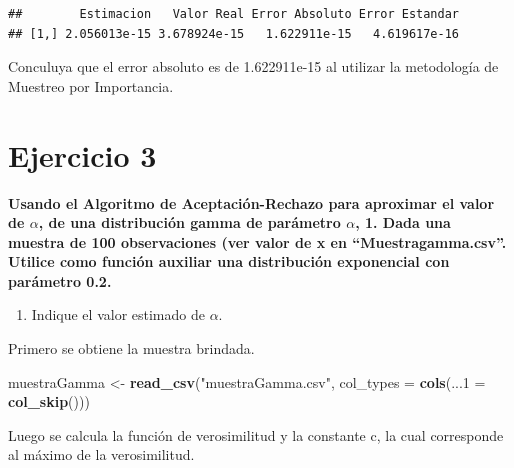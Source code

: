 \documentclass[
]{article}
\newenvironment{Shaded}{\begin{snugshade}}{\end{snugshade}}
\newcommand{\AttributeTok}[1]{\textcolor[rgb]{0.13,0.29,0.53}{#1}}
\newcommand{\ConstantTok}[1]{\textcolor[rgb]{0.56,0.35,0.01}{#1}}
\newcommand{\ControlFlowTok}[1]{\textcolor[rgb]{0.13,0.29,0.53}{\textbf{#1}}}
\newcommand{\FunctionTok}[1]{\textcolor[rgb]{0.13,0.29,0.53}{\textbf{#1}}}
\newcommand{\NormalTok}[1]{#1}
\newcommand{\OtherTok}[1]{\textcolor[rgb]{0.56,0.35,0.01}{#1}}
\newcommand{\SpecialCharTok}[1]{\textcolor[rgb]{0.81,0.36,0.00}{\textbf{#1}}}
\newcommand{\StringTok}[1]{\textcolor[rgb]{0.31,0.60,0.02}{#1}}
\providecommand{\tightlist}{%
  \setlength{\itemsep}{0pt}\setlength{\parskip}{0pt}}
\begin{document}
\begin{verbatim}
##        Estimacion   Valor Real Error Absoluto Error Estandar
## [1,] 2.056013e-15 3.678924e-15   1.622911e-15   4.619617e-16
\end{verbatim}

Conculuya que el error absoluto es de 1.622911e-15 al utilizar la
metodología de Muestreo por Importancia.

\newpage

\hypertarget{ejercicio-3}{%
\section{Ejercicio 3}\label{ejercicio-3}}

\textbf{Usando el Algoritmo de Aceptación-Rechazo para aproximar el
valor de \(\alpha\), de una distribución gamma de parámetro \(\alpha\),
1. Dada una muestra de 100 observaciones (ver valor de x en
``Muestragamma.csv''. Utilice como función auxiliar una distribución
exponencial con parámetro 0.2.}

\begin{enumerate}
\def\labelenumi{\alph{enumi}.}
\tightlist
\item
  Indique el valor estimado de \(\alpha\).
\end{enumerate}

Primero se obtiene la muestra brindada.

\begin{Shaded}
\begin{Highlighting}[]
\NormalTok{muestraGamma }\OtherTok{\textless{}{-}} \FunctionTok{read\_csv}\NormalTok{(}\StringTok{"muestraGamma.csv"}\NormalTok{, }
                         \AttributeTok{col\_types =} \FunctionTok{cols}\NormalTok{(}\AttributeTok{...1 =} \FunctionTok{col\_skip}\NormalTok{()))}
\end{Highlighting}
\end{Shaded}

Luego se calcula la función de verosimilitud y la constante c, la cual
corresponde al máximo de la verosimilitud.

\begin{Shaded}
\end{Shaded}
\end{document}
